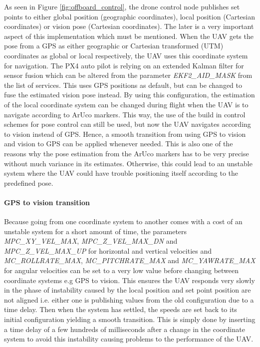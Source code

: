 \documentclass[../Head/report.tex]{subfiles}
\begin{document}
As seen in Figure \ref{fig:offboard_control}, the drone control node publishes set points to either global position (geographic coordinates), local position (Cartesian coordinates) or vision pose (Cartesian coordinates). The later is a very important aspect of this implementation which must be mentioned. When the UAV gets the pose from a GPS as either   geographic or Cartesian transformed (UTM) coordinates as global or local respectively, the UAV uses this coordinate system for navigation. The PX4 auto pilot is relying on an extended Kalman filter for sensor fusion which can be altered from the parameter \textit{EKF2\_AID\_MASK} from the list of services. This uses GPS positions as default, but can be changed to fuse the estimated vision pose instead. By using this configuration, the estimation of the local coordinate system can be changed during flight when the UAV is to navigate according to ArUco markers. This way, the use of the build in control schemes for pose control can still be used, but now the UAV navigates according to vision instead of GPS. Hence, a smooth transition from using GPS to vision and vision to GPS can be applied whenever needed. This is also one of the reasons why the pose estimation from the ArUco markers has to be very precise without much variance in its estimates. Otherwise, this could lead to an unstable system where the UAV could have trouble positioning itself according to the predefined pose. 

\paragraph{GPS to vision transition}
\label{sec:gps_to_vision_transition}

Because going from one coordinate system to another comes with a cost of an unstable system for a short amount of time, the parameters \textit{MPC\_XY\_VEL\_MAX}, \textit{MPC\_Z\_VEL\_MAX\_DN} and  \textit{MPC\_Z\_VEL\_MAX\_UP} for horizontal and vertical velocities  and \textit{MC\_ROLLRATE\_MAX}, \textit{MC\_PITCHRATE\_MAX} and \textit{MC\_YAWRATE\_MAX} for angular velocities can be set to a very low value before changing between coordinate systems e.g GPS to vision. This ensures the UAV responds very slowly in the phase of instability caused by the local position and set point position are not aligned i.e. either one is publishing values from the old configuration due to a time delay. Then when the system has settled, the speeds are set back to its initial configuration yielding a smooth transition. This is simply done by inserting a time delay of a few hundreds of milliseconds after a change in the coordinate system to avoid this instability causing problems to the performance of the UAV.
\end{document}
